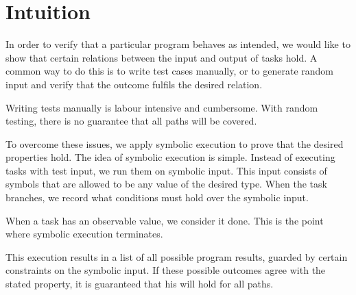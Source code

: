 


\section{Intuition}
\label{sec:intuition}

In order to verify that a particular \TOPHAT program behaves as intended,
we would like to show that certain relations between the input and output of tasks hold.
A common way to do this is to write test cases manually,
or to generate random input and verify that the outcome fulfils the desired relation.

Writing tests manually is labour intensive and cumbersome.
With random testing, there is no guarantee that all paths will be covered.

To overcome these issues, we apply symbolic execution to prove that the desired properties hold.
The idea of symbolic execution is simple.
Instead of executing tasks with test input, we run them on symbolic input.
This input consists of symbols that are allowed to be any value of the desired type.
When the task branches, we record what conditions must hold over the symbolic input.

When a task has an observable value, we consider it done.
This is the point where symbolic execution terminates.

This execution results in a list of all possible program results,
guarded by certain constraints on the symbolic input.
If these possible outcomes agree with the stated property,
it is guaranteed that his will hold for all paths.


